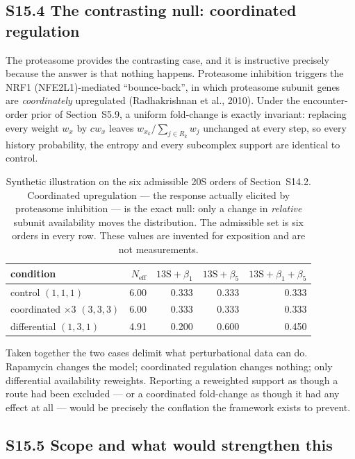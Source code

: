 \subsection*{S15.4 The contrasting null: coordinated regulation}

The proteasome provides the contrasting case, and it is instructive precisely
because the answer is that nothing happens. Proteasome inhibition triggers the
NRF1 (NFE2L1)-mediated ``bounce-back'', in which proteasome subunit genes are
\emph{coordinately} upregulated (Radhakrishnan et al., 2010). Under the
encounter-order prior of Section~S5.9, a uniform fold-change is exactly
invariant: replacing every weight $w_x$ by $cw_x$ leaves
$w_{x_k} / \sum_{j \in R_k} w_j$ unchanged at every step, so every history
probability, the entropy and every subcomplex support are identical to control.

\begin{table}[h]
\centering\small
\begin{tabular}{lrrrr}
\hline
condition & $N_{\mathrm{eff}}$ & $13\mathrm{S}{+}\beta_1$
 & $13\mathrm{S}{+}\beta_5$ & $13\mathrm{S}{+}\beta_1{+}\beta_5$ \\
\hline
control $(1,1,1)$                & 6.00 & 0.333 & 0.333 & 0.333 \\
coordinated $\times 3$ $(3,3,3)$ & 6.00 & 0.333 & 0.333 & 0.333 \\
differential $(1,3,1)$           & 4.91 & 0.200 & 0.600 & 0.450 \\
\hline
\end{tabular}
\caption{Synthetic illustration on the six admissible 20S orders of
Section~S14.2. Coordinated upregulation --- the response actually elicited by
proteasome inhibition --- is the exact null: only a change in \emph{relative}
subunit availability moves the distribution. The admissible set is six orders in
every row. These values are invented for exposition and are not measurements.}
\label{tab:weightnull}
\end{table}

Taken together the two cases delimit what perturbational data can do. Rapamycin
changes the model; coordinated regulation changes nothing; only differential
availability reweights. Reporting a reweighted support as though a route had
been excluded --- or a coordinated fold-change as though it had any effect at
all --- would be precisely the conflation the framework exists to prevent.

\subsection*{S15.5 Scope and what would strengthen this}

